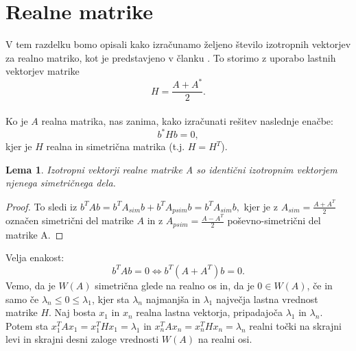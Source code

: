 \documentclass[12pt,a4paper]{amsart}
\theoremstyle{definition}
\theoremstyle{plain}
\newtheorem{lema}[definicija]{Lema}
\begin{document}
\section{Realne matrike}\label{Realne matrike}
V tem razdelku bomo opisali kako izračunamo željeno število izotropnih vektorjev za realno matriko, kot je predstavjeno v članku \cite{meurant}. To storimo z uporabo lastnih vektorjev matrike $$H=\frac{A+A^\ast}{2}.$$\\
Ko je $A$ realna matrika, nas zanima, kako izračunati rešitev naslednje enačbe:
\begin{equation}\label{eq:realna}
b^\ast Hb=0,
\end{equation}
kjer je $H$ realna in simetrična matrika (t.j. $H=H^T$).
\begin{lema} \cite{lipkin}
Izotropni vektorji realne matrike A so identični izotropnim vektorjem njenega simetričnega dela.
\end{lema} 
\begin{proof}
To sledi iz $b^T Ab=b^T A_{sim} b +b^T A_{psim} b=b^T A_{sim} b,$ kjer je z $A_{sim}=\frac{A+A^T}{2}$ označen simetrični del matrike $A$ in z $A_{psim}=\frac{A-A^T}{2}$ poševno-simetrični del matrike A.
\end{proof}
Velja enakost:
$$b^T Ab=0 \Leftrightarrow b^T (A+A^T)b=0.$$  
Vemo, da je $W(A)$ simetrična glede na realno os in, da je $0 \in W(A)$, če in samo če $\lambda_n\le0\le\lambda_1$, kjer sta $\lambda_n$ najmanjša in $\lambda_1$ največja lastna vrednost matrike $H$. Naj bosta $x_1$ in $x_n$ realna lastna vektorja, pripadajoča $\lambda_1$ in $\lambda_n$.  Potem sta $x_1^T Ax_1=x_1^T Hx_1=\lambda_1$ in $x_n^T Ax_n=x_n^T Hx_n=\lambda_n$ realni točki na skrajni levi in skrajni desni zaloge vrednosti $W(A)$ na realni osi.\\
\end{document}
